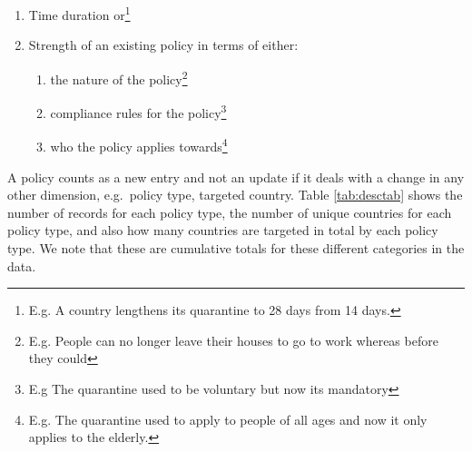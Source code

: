\documentclass[]{article}
\providecommand{\tightlist}{%
  \setlength{\itemsep}{0pt}\setlength{\parskip}{0pt}}
\let\rmarkdownfootnote\footnote%
\def\footnote{\protect\rmarkdownfootnote}
\begin{document}
\begin{enumerate}
\def\labelenumi{\arabic{enumi}.}
\tightlist
\item
  Time duration or\footnote{E.g. A country lengthens its quarantine to 28 days from 14 days.}
\item
  Strength of an existing policy in terms of either:

  \begin{enumerate}
  \def\labelenumii{\alph{enumii}.}
  \tightlist
  \item
    the nature of the policy\footnote{E.g. People can no longer leave their houses to go to work whereas before they could}
  \item
    compliance rules for the policy\footnote{E.g The quarantine used to be voluntary but now its mandatory}
  \item
    who the policy applies towards\footnote{E.g. The quarantine used to apply to people of all ages and now it only applies to the elderly.}
  \end{enumerate}
\end{enumerate}

A policy counts as a new entry and not an update if it deals with a change in any other dimension, e.g.~policy type, targeted country. Table \ref{tab:desctab} shows the number of records for each policy type, the number of unique countries for each policy type, and also how many countries are targeted in total by each policy type. We note that these are cumulative totals for these different categories in the data.
\end{document}
